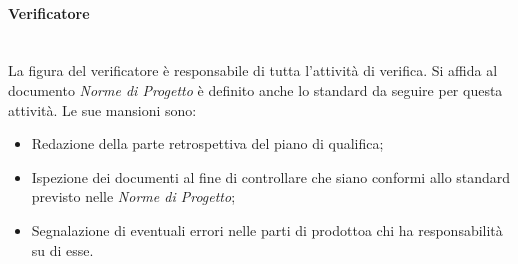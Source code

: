 			\paragraph{Verificatore}\mbox{}\\ [1mm]
				La figura del verificatore è responsabile di tutta l'attività di verifica.
				Si affida al documento \textit{Norme di Progetto} è definito anche lo standard da seguire per questa attività.
				Le sue mansioni sono:
				\begin{itemize}
					\item Redazione della parte retrospettiva del piano di qualifica;
					\item Ispezione dei documenti al fine di controllare che siano conformi allo standard previsto nelle \textit{Norme di Progetto};
					\item Segnalazione di eventuali errori nelle parti di prodotto\glosp a chi ha responsabilità su di esse.
				\end{itemize}
